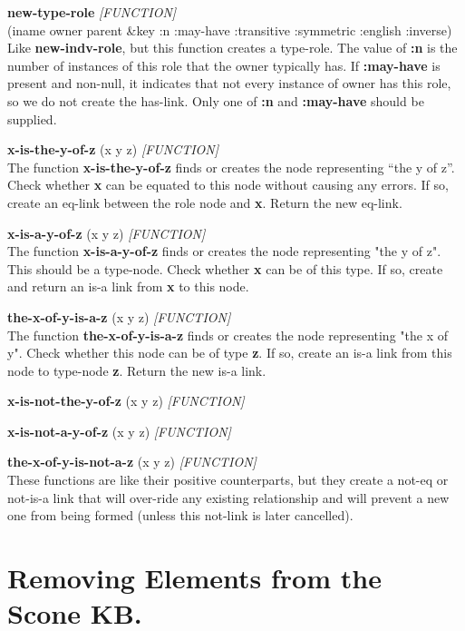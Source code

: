 \documentclass[titlepage,twoside,openright,11pt]{article}
\begin{document}
\textbf{new-type-role} \emph{{[}FUNCTION{]}\\
}(iname owner parent \&key :n :may-have :transitive :symmetric :english
:inverse)\\
Like \textbf{new-indv-role}, but this function creates a type-role. The
value of \textbf{:n} is the number of instances of this role that the
owner typically has. If \textbf{:may-have} is present and non-null, it
indicates that not every instance of owner has this role, so we do not
create the has-link. Only one of \textbf{:n} and \textbf{:may-have}
should be supplied.

\textbf{x-is-the-y-of-z} (x y z) \emph{{[}FUNCTION{]}}\\
The function \textbf{x-is-the-y-of-z} finds or creates the node
representing ``the y of z''. Check whether \textbf{x} can be equated to
this node without causing any errors. If so, create an eq-link between
the role node and \textbf{x}. Return the new eq-link.

\textbf{x-is-a-y-of-z} (x y z) \emph{{[}FUNCTION{]}}\\
The function \textbf{x-is-a-y-of-z} finds or creates the node
representing "the y of z". This should be a type-node. Check whether
\textbf{x} can be of this type. If so, create and return an is-a link
from \textbf{x} to this node.

\textbf{the-x-of-y-is-a-z} (x y z) \emph{{[}FUNCTION{]}}\\
The function \textbf{the-x-of-y-is-a-z} finds or creates the node
representing "the x of y". Check whether this node can be of type
\textbf{z}. If so, create an is-a link from this node to type-node
\textbf{z}. Return the new is-a link.

\textbf{x-is-not-the-y-of-z} (x y z) \emph{{[}FUNCTION{]}}

\textbf{x-is-not-a-y-of-z} (x y z) \emph{{[}FUNCTION{]}}

\textbf{the-x-of-y-is-not-a-z} (x y z) \emph{{[}FUNCTION{]}}\\
These functions are like their positive counterparts, but they create a
not-eq or not-is-a link that will over-ride any existing relationship
and will prevent a new one from being formed (unless this not-link is
later cancelled).

\section{Removing Elements from the Scone
KB.}\label{removing-elements-from-the-scone-kb.}
\end{document}
